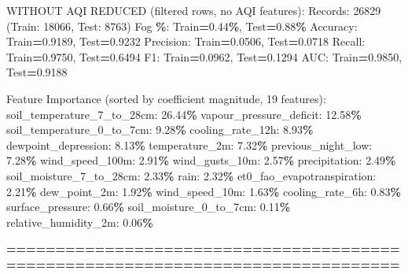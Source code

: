 \documentclass[
  letterpaper,
  DIV=11,
  numbers=noendperiod]{scrartcl}
\newenvironment{Shaded}{\begin{snugshade}}{\end{snugshade}}
\newcommand{\BuiltInTok}[1]{#1}
\newcommand{\DecValTok}[1]{\textcolor[rgb]{0.00,0.00,0.81}{#1}}
\newcommand{\FloatTok}[1]{\textcolor[rgb]{0.00,0.00,0.81}{#1}}
\newcommand{\NormalTok}[1]{#1}
\newcommand{\OperatorTok}[1]{\textcolor[rgb]{0.81,0.36,0.00}{\textbf{#1}}}
\begin{document}
\begin{Shaded}
\begin{Highlighting}[]
\NormalTok{WITHOUT AQI REDUCED (filtered rows, no AQI features):}
\NormalTok{  Records: }\DecValTok{26829}\NormalTok{ (Train: }\DecValTok{18066}\NormalTok{, Test: }\DecValTok{8763}\NormalTok{)}
\NormalTok{  Fog }\OperatorTok{\%}\NormalTok{: Train}\OperatorTok{=}\FloatTok{0.44}\OperatorTok{\%}\NormalTok{, Test}\OperatorTok{=}\FloatTok{0.88}\OperatorTok{\%}
\NormalTok{  Accuracy: Train}\OperatorTok{=}\FloatTok{0.9189}\NormalTok{, Test}\OperatorTok{=}\FloatTok{0.9232}
\NormalTok{  Precision: Train}\OperatorTok{=}\FloatTok{0.0506}\NormalTok{, Test}\OperatorTok{=}\FloatTok{0.0718}
\NormalTok{  Recall: Train}\OperatorTok{=}\FloatTok{0.9750}\NormalTok{, Test}\OperatorTok{=}\FloatTok{0.6494}
\NormalTok{  F1: Train}\OperatorTok{=}\FloatTok{0.0962}\NormalTok{, Test}\OperatorTok{=}\FloatTok{0.1294}
\NormalTok{  AUC: Train}\OperatorTok{=}\FloatTok{0.9850}\NormalTok{, Test}\OperatorTok{=}\FloatTok{0.9188}

\NormalTok{  Feature Importance (}\BuiltInTok{sorted}\NormalTok{ by coefficient magnitude, }\DecValTok{19}\NormalTok{ features):}
\NormalTok{    soil\_temperature\_7\_to\_28cm: }\FloatTok{26.44}\OperatorTok{\%}
\NormalTok{    vapour\_pressure\_deficit: }\FloatTok{12.58}\OperatorTok{\%}
\NormalTok{    soil\_temperature\_0\_to\_7cm: }\FloatTok{9.28}\OperatorTok{\%}
\NormalTok{    cooling\_rate\_12h: }\FloatTok{8.93}\OperatorTok{\%}
\NormalTok{    dewpoint\_depression: }\FloatTok{8.13}\OperatorTok{\%}
\NormalTok{    temperature\_2m: }\FloatTok{7.32}\OperatorTok{\%}
\NormalTok{    previous\_night\_low: }\FloatTok{7.28}\OperatorTok{\%}
\NormalTok{    wind\_speed\_100m: }\FloatTok{2.91}\OperatorTok{\%}
\NormalTok{    wind\_gusts\_10m: }\FloatTok{2.57}\OperatorTok{\%}
\NormalTok{    precipitation: }\FloatTok{2.49}\OperatorTok{\%}
\NormalTok{    soil\_moisture\_7\_to\_28cm: }\FloatTok{2.33}\OperatorTok{\%}
\NormalTok{    rain: }\FloatTok{2.32}\OperatorTok{\%}
\NormalTok{    et0\_fao\_evapotranspiration: }\FloatTok{2.21}\OperatorTok{\%}
\NormalTok{    dew\_point\_2m: }\FloatTok{1.92}\OperatorTok{\%}
\NormalTok{    wind\_speed\_10m: }\FloatTok{1.63}\OperatorTok{\%}
\NormalTok{    cooling\_rate\_6h: }\FloatTok{0.83}\OperatorTok{\%}
\NormalTok{    surface\_pressure: }\FloatTok{0.66}\OperatorTok{\%}
\NormalTok{    soil\_moisture\_0\_to\_7cm: }\FloatTok{0.11}\OperatorTok{\%}
\NormalTok{    relative\_humidity\_2m: }\FloatTok{0.06}\OperatorTok{\%}

\OperatorTok{================================================================================}


\end{Highlighting}
\end{Shaded}
\end{document}
